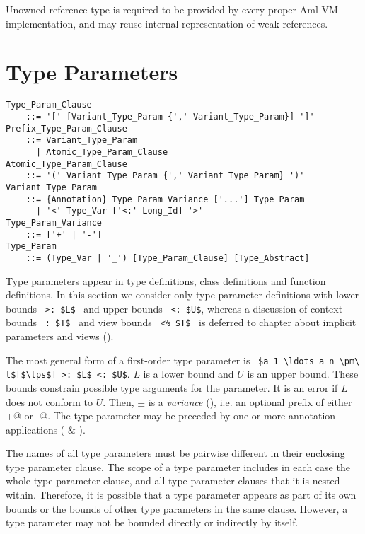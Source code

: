 Unowned reference type is required to be provided by every proper Aml VM implementation, and may reuse internal representation of weak references. 





\section{Type Parameters}

\grammar\begin{lstlisting}
Type_Param_Clause 
    ::= '[' [Variant_Type_Param {',' Variant_Type_Param}] ']'
Prefix_Type_Param_Clause
    ::= Variant_Type_Param
      | Atomic_Type_Param_Clause
Atomic_Type_Param_Clause
    ::= '(' Variant_Type_Param {',' Variant_Type_Param} ')'
Variant_Type_Param 
    ::= {Annotation} Type_Param_Variance ['...'] Type_Param
      | '<' Type_Var ['<:' Long_Id] '>'
Type_Param_Variance
    ::= ['+' | '-']
Type_Param 
    ::= (Type_Var | '_') [Type_Param_Clause] [Type_Abstract]
\end{lstlisting}

Type parameters appear in type definitions, class definitions and function definitions. In this section we consider only type parameter definitions with lower bounds ~\lstinline!>: $L$!~ and upper bounds ~\lstinline!<: $U$!, whereas a discussion of context bounds ~\lstinline!: $T$!~ and view bounds ~\lstinline!<% $T$!~ is deferred to chapter about implicit parameters and views ().

The most general form of a first-order type parameter is ~\lstinline!$a_1 \ldots a_n \pm\ t$[$\tps$] >: $L$ <: $U$!. $L$ is a lower bound and $U$ is an upper bound. These bounds constrain possible type arguments for the parameter. It is an error if $L$ does not conform to $U$. Then, $\pm$ is a {\em variance} (), i.e. an optional prefix of either \lstinline@+@ or \lstinline@-@. The type parameter may be preceded by one or more annotation applications ( \& ).

The names of all type parameters must be pairwise different in their enclosing type parameter clause. The scope of a type parameter includes in each case the whole type parameter clause, and all type parameter clauses that it is nested within. Therefore, it is possible that a type parameter appears as part of its own bounds or the bounds of other type parameters in the same clause. However, a type parameter may not be bounded directly or indirectly by itself. 

